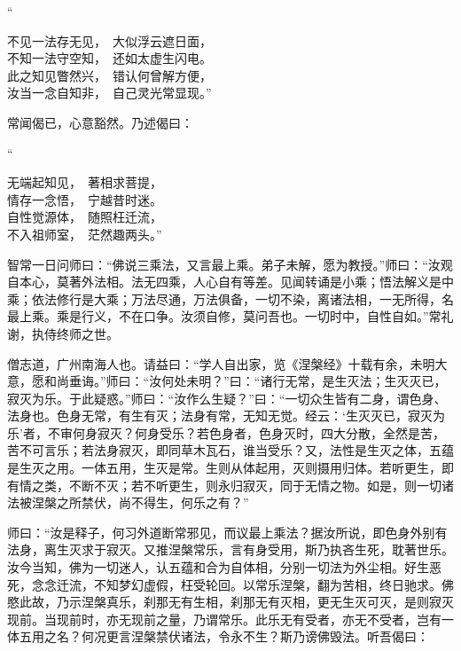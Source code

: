 \documentclass[UTF8, 11pt, oneside]{ctexart}
\newenvironment{jizi}[1]{
    \vspace{-1em}\begin{center}
        #1%
        \begin{varwidth}[t]{\linewidth}
}{
        \end{varwidth}
    \end{center}
}
\begin{document}
\begin{jizi}{“}
    不见一法存无见，　大似浮云遮日面， \\
    不知一法守空知，　还如太虚生闪电。 \\
    此之知见瞥然兴，　错认何曾解方便， \\
    汝当一念自知非，　自己灵光常显现。”
\end{jizi}

常闻偈已，心意豁然。乃述偈曰：

\begin{jizi}{“}
    无端起知见，　著相求菩提， \\
    情存一念悟，　宁越昔时迷。 \\
    自性觉源体，　随照枉迁流， \\
    不入祖师室，　茫然趣两头。”
\end{jizi}

智常一日问师曰：“佛说三乘法，又言最上乘。弟子未解，愿为教授。”师曰：“汝观自本心，莫著外法相。法无四乘，人心自有等差。见闻转诵是小乘；悟法解义是中乘；依法修行是大乘；万法尽通，万法俱备，一切不染，离诸法相，一无所得，名最上乘。乘是行义，不在口争。汝须自修，莫问吾也。一切时中，自性自如。”常礼谢，执侍终师之世。

僧志道，广州南海人也。请益曰：“学人自出家，览《涅槃经》十载有余，未明大意，愿和尚垂诲。”师曰：“汝何处未明？”曰：“诸行无常，是生灭法；生灭灭已，寂灭为乐。于此疑惑。”师曰：“汝作么生疑？”曰：“一切众生皆有二身，谓色身、法身也。色身无常，有生有灭；法身有常，无知无觉。经云：‘生灭灭已，寂灭为乐’者，不审何身寂灭？何身受乐？若色身者，色身灭时，四大分散，全然是苦，苦不可言乐；若法身寂灭，即同草木瓦石，谁当受乐？又，法性是生灭之体，五蕴是生灭之用。一体五用，生灭是常。生则从体起用，灭则摄用归体。若听更生，即有情之类，不断不灭；若不听更生，则永归寂灭，同于无情之物。如是，则一切诸法被涅槃之所禁伏，尚不得生，何乐之有？”

师曰：“汝是释子，何习外道断常邪见，而议最上乘法？据汝所说，即色身外别有法身，离生灭求于寂灭。又推涅槃常乐，言有身受用，斯乃执吝生死，耽著世乐。汝今当知，佛为一切迷人，认五蕴和合为自体相，分别一切法为外尘相。好生恶死，念念迁流，不知梦幻虚假，枉受轮回。以常乐涅槃，翻为苦相，终日驰求。佛愍此故，乃示涅槃真乐，刹那无有生相，刹那无有灭相，更无生灭可灭，是则寂灭现前。当现前时，亦无现前之量，乃谓常乐。此乐无有受者，亦无不受者，岂有一体五用之名？何况更言涅槃禁伏诸法，令永不生？斯乃谤佛毁法。听吾偈曰：
\end{document}
